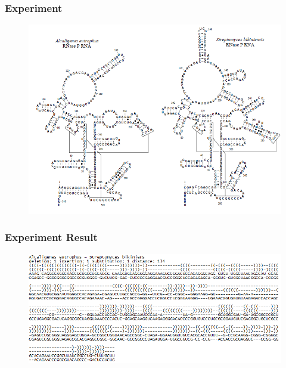 \documentclass{beamer}
\begin{document}
\begin{frame}
\frametitle{Experiment}
\begin{figure}
	\includegraphics[width=0.8\linewidth]{RNAGraphExample}
	\centering
\end{figure}
\end{frame}
\begin{frame}
\frametitle{Experiment Result}
\begin{figure}
	\includegraphics[width=1.0\linewidth]{AlignmentResult}
	\centering
\end{figure}
\end{frame}
\end{document}
